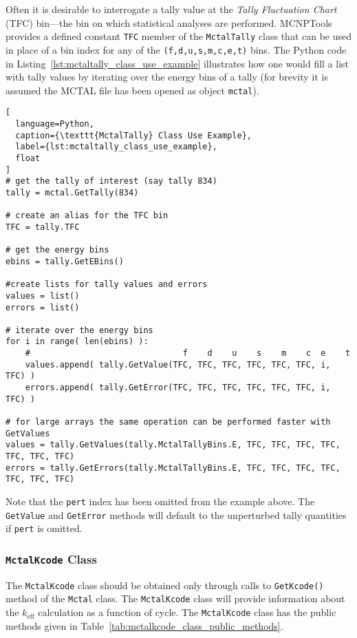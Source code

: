\documentclass[11pt]{article}
\begin{document}
Often it is desirable to interrogate a tally value at the \emph{Tally
Fluctuation Chart} (TFC) bin---the bin on which statistical analyses are
performed. MCNPTools provides a defined constant \texttt{TFC} member of the
\texttt{MctalTally} class that can be used in place of a bin index for any of
the \texttt{(f,d,u,s,m,c,e,t)} bins. The Python code in
Listing~\ref{lst:mctaltally_class_use_example} illustrates how one would fill a
list with tally values by iterating over the energy bins of a tally (for brevity
it is assumed the MCTAL file has been opened as object \texttt{mctal}).

\begin{lstlisting}[
  language=Python,
  caption={\texttt{MctalTally} Class Use Example},
  label={lst:mctaltally_class_use_example},
  float
]
# get the tally of interest (say tally 834)
tally = mctal.GetTally(834)

# create an alias for the TFC bin
TFC = tally.TFC

# get the energy bins
ebins = tally.GetEBins()

#create lists for tally values and errors
values = list()
errors = list()

# iterate over the energy bins
for i in range( len(ebins) ):
    #                               f    d    u    s    m    c  e    t
    values.append( tally.GetValue(TFC, TFC, TFC, TFC, TFC, TFC, i, TFC) )
    errors.append( tally.GetError(TFC, TFC, TFC, TFC, TFC, TFC, i, TFC) )

# for large arrays the same operation can be performed faster with GetValues
values = tally.GetValues(tally.MctalTallyBins.E, TFC, TFC, TFC, TFC, TFC, TFC, TFC)
errors = tally.GetErrors(tally.MctalTallyBins.E, TFC, TFC, TFC, TFC, TFC, TFC, TFC)

\end{lstlisting}

Note that the \texttt{pert} index has been omitted from the example above. The
\texttt{GetValue} and \texttt{GetError} methods will default to the unperturbed
tally quantities if \texttt{pert} is omitted.

\subsubsection{\texttt{MctalKcode} Class}\label{the-mctalkcode-class}

The \texttt{MctalKcode} class should be obtained only through calls to
\texttt{GetKcode()} method of the \texttt{Mctal} class. The \texttt{MctalKcode}
class will provide information about the $k_{\mathrm{eff}}$ calculation as a
function of cycle. The \texttt{MctalKcode} class has the public methods given in
Table~\ref{tab:mctalkcode_class_public_methods}.
\end{document}
